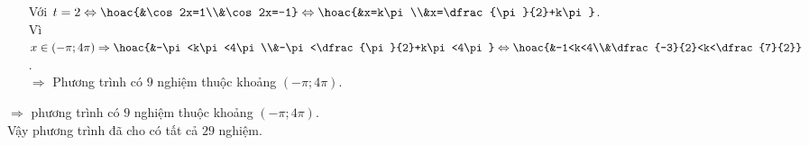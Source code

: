 \begin{ex}
{\begin{enumerate}
			$\Rightarrow$ Phương trình có $20$ nghiệm thuộc khoảng $\left(-\pi;4\pi\right)$.
			\item[Với] $t=2\Leftrightarrow\hoac{&\cos 2x=1\\&\cos 2x=-1}\Leftrightarrow\hoac{&x=k\pi\\&x=\dfrac{\pi}{2}+k\pi}$.\\
			Vì $x\in\left(-\pi;4\pi\right)\Rightarrow\hoac{&-\pi<k\pi<4\pi\\&-\pi<\dfrac{\pi}{2}+k\pi<4\pi}\Leftrightarrow\hoac{&-1<k<4\\&\dfrac{-3}{2}<k<\dfrac{7}{2}}$.\\
			$\Rightarrow$ Phương trình có $9$ nghiệm thuộc khoảng $\left(-\pi;4\pi\right).$
		\end{enumerate}
		$\Rightarrow $ phương trình có $9$ nghiệm thuộc khoảng $( -\pi ;4\pi )$.\\
		Vậy phương trình đã cho có tất cả $29$ nghiệm.
	} 
\end{ex}
